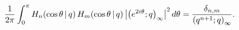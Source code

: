 \[\frac{1}{2\pi}\int_{0}^{\pi}\mathop{H_{n}\/}\nolimits\!\left(\mathop{\cos\/}%
\nolimits\theta\,|\,q\right)\mathop{H_{m}\/}\nolimits\!\left(\mathop{\cos\/}%
\nolimits\theta\,|\,q\right)\left|\left(e^{2i\theta};q\right)_{\infty}\right|^%
{2}d\theta=\frac{\delta_{n,m}}{\left(q^{n+1};q\right)_{\infty}}.\]